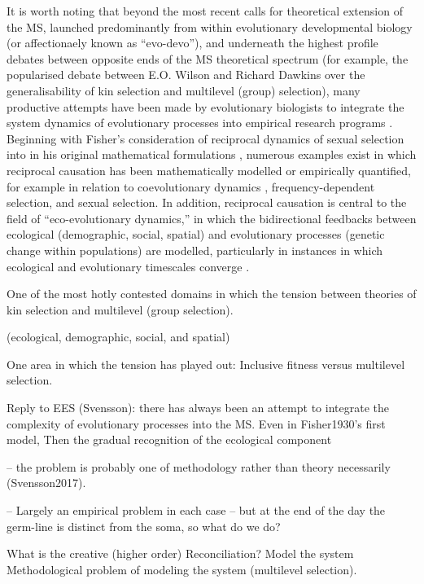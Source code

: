 It is worth noting that beyond the most recent calls for theoretical extension of the MS, launched predominantly from within evolutionary developmental biology (or affectionaely known as ``evo-devo''), and underneath the highest profile debates between opposite ends of the MS theoretical spectrum (for example, the popularised debate between E.O. Wilson and Richard Dawkins over the generalisability of kin selection and multilevel (group) selection), many  productive attempts have been made by evolutionary biologists to integrate the system dynamics of evolutionary processes into empirical research programs \citep{Svensson2017}.  Beginning with Fisher's consideration of reciprocal dynamics of sexual selection into in his original mathematical formulations \citep{Fisher1930}, numerous examples exist in which reciprocal causation has been mathematically modelled or empirically quantified, for example in relation to coevolutionary dynamics , frequency-dependent selection, and sexual selection.  In addition, reciprocal causation is central to the field of ``eco-evolutionary dynamics,'' in which the bidirectional feedbacks between ecological (demographic, social, spatial) and evolutionary processes (genetic change within populations) are modelled, particularly in instances in which ecological and evolutionary timescales converge \citep{Hendry2017}.



One of the most hotly contested domains in which the tension between theories of kin selection and multilevel (group selection).



(ecological, demographic, social, and spatial)

One area in which the tension has played out: Inclusive fitness versus multilevel selection.

Reply to EES (Svensson): there has always been an attempt to integrate the complexity of evolutionary processes into the MS.
Even in Fisher1930's first model,
Then the gradual recognition of the ecological component

-- the problem is probably one of methodology rather than theory necessarily (Svensson2017).


-- Largely an empirical problem in each case
-- but at the end of the day the germ-line is distinct from the soma, so what do we do?


What is the creative (higher order) Reconciliation?
Model the system
Methodological problem of modeling the system (multilevel selection).

